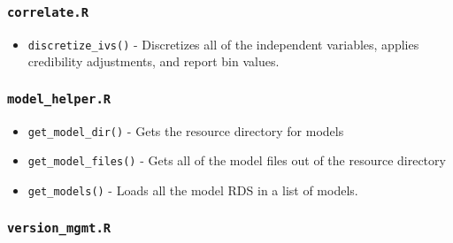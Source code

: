 \documentclass[
]{book}
\providecommand{\tightlist}{%
  \setlength{\itemsep}{0pt}\setlength{\parskip}{0pt}}
\begin{document}
\hypertarget{correlate.r}{%
\subsubsection{\texorpdfstring{\texttt{correlate.R}}{correlate.R}}\label{correlate.r}}

\begin{itemize}
\tightlist
\item
  \texttt{discretize\_ivs()} - Discretizes all of the independent variables, applies credibility adjustments, and report bin values.
\end{itemize}

\hypertarget{model_helper.r}{%
\subsubsection{\texorpdfstring{\texttt{model\_helper.R}}{model\_helper.R}}\label{model_helper.r}}

\begin{itemize}
\tightlist
\item
  \texttt{get\_model\_dir()} - Gets the resource directory for models
\item
  \texttt{get\_model\_files()} - Gets all of the model files out of the resource directory
\item
  \texttt{get\_models()} - Loads all the model RDS in a list of models.
\end{itemize}

\hypertarget{version_mgmt.r}{%
\subsubsection{\texorpdfstring{\texttt{version\_mgmt.R}}{version\_mgmt.R}}\label{version_mgmt.r}}
\end{document}

